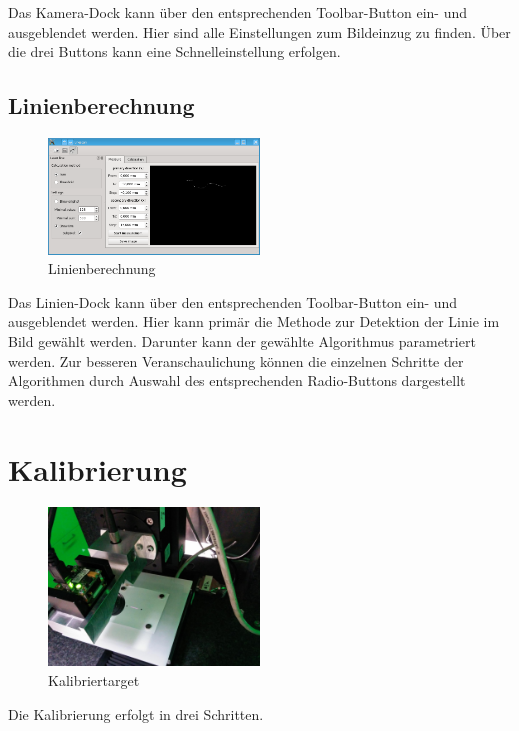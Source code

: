\documentclass[a4paper,10pt]{scrartcl}
\begin{document}
Das Kamera-Dock kann über den entsprechenden Toolbar-Button ein- und ausgeblendet werden.
Hier sind alle Einstellungen zum Bildeinzug zu finden. Über die drei Buttons kann eine
Schnelleinstellung erfolgen.

\subsection{Linienberechnung}

\begin{figure}[H]
  \centering
  \includegraphics[width=0.5\textwidth]{include/laser.png}
  \caption{Linienberechnung}
  \label{fig:overview}
\end{figure}

Das Linien-Dock kann über den entsprechenden Toolbar-Button ein- und ausgeblendet werden.
Hier kann primär die Methode zur Detektion der Linie im Bild gewählt werden. Darunter kann
der gewählte Algorithmus parametriert werden. Zur besseren Veranschaulichung können die einzelnen
Schritte der Algorithmen durch Auswahl des entsprechenden Radio-Buttons dargestellt werden.

\newpage
\section{Kalibrierung}

\begin{figure}[H]
  \centering
  \includegraphics[width=0.5\textwidth]{include/IMG_20160412_162021.jpg}
  \caption{Kalibriertarget}
  \label{fig:overview}
\end{figure}

Die Kalibrierung erfolgt in drei Schritten.
\end{document}
